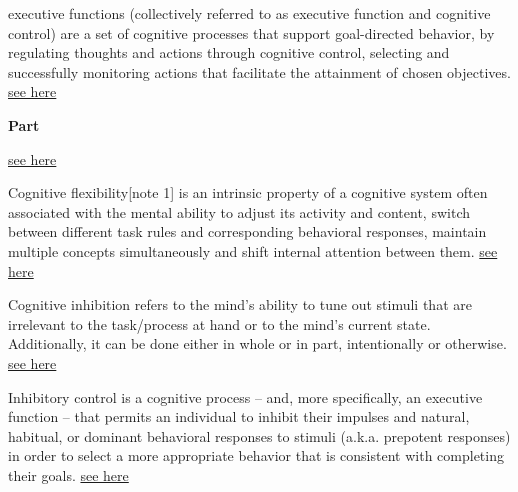 \documentclass{book}
\newcommand{\seehere}[1]{\href{#1}{see here}}
\providecommand{\ProjectDeepHeading}[2]{%
    \par\medskip\noindent\textbf{#2}\par\smallskip
}
\providecommand{\seehere}[1]{\href{#1}{see here}}
\begin{document}
executive functions (collectively referred to as executive function and cognitive control) are a set of cognitive processes that support goal-directed behavior, by regulating thoughts and actions through cognitive control, selecting and successfully monitoring actions that facilitate the attainment of chosen objectives.
    \seehere{https://en.wikipedia.org/wiki/Executive_functions}

\ProjectDeepHeading{5}{Part}


\seehere{https://en.wikipedia.org/wiki/Attentional_control}


Cognitive flexibility[note 1] is an intrinsic property of a cognitive system often associated with the mental ability to adjust its activity and content, switch between different task rules and corresponding behavioral responses, maintain multiple concepts simultaneously and shift internal attention between them. \seehere{https://en.wikipedia.org/wiki/Cognitive_flexibility}


Cognitive inhibition refers to the mind's ability to tune out stimuli that are irrelevant to the task/process at hand or to the mind's current state. Additionally, it can be done either in whole or in part, intentionally or otherwise. \seehere{https://en.wikipedia.org/wiki/Cognitive_inhibition}


Inhibitory control is a cognitive process – and, more specifically, an executive function – that permits an individual to inhibit their impulses and natural, habitual, or dominant behavioral responses to stimuli (a.k.a. prepotent responses) in order to select a more appropriate behavior that is consistent with completing their goals. \seehere{https://en.wikipedia.org/wiki/Inhibitory_control}
\end{document}
